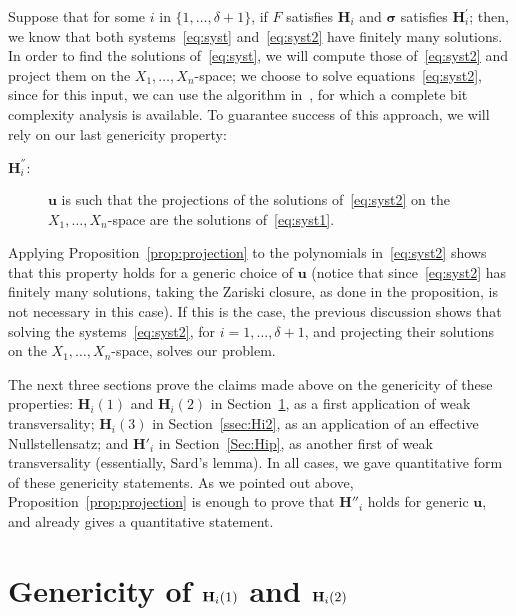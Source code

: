 \documentclass[12pt]{article}
\begin{document}
Suppose that for some $i$ in $\{1,\dots,\delta+1\}$, if $F$ satisfies
$\bm H_i$ and $\bm \sigma$ satisfies $\bm H_i^{'}$; then, we know that
both systems~\eqref{eq:syst} and~\eqref{eq:syst2} have finitely many
solutions. In order to find the solutions of~\eqref{eq:syst}, we will
compute those of~\eqref{eq:syst2} and project them on the
$X_1,\dots,X_n$-space; we choose to solve equations~\eqref{eq:syst2},
since for this input, we can use the algorithm in~\cite{SH}, for which
a complete bit complexity analysis is available. To guarantee success
of this approach, we will rely on our last genericity property:
\begin{description}
\item [$\bm H^{''}_i:$] $\bm u$ is such that the projections of the
  solutions of~\eqref{eq:syst2} on the $X_1,\dots,X_n$-space are the
  solutions of~\eqref{eq:syst1}.
\end{description}
Applying Proposition~\ref{prop:projection} to the polynomials
in~\eqref{eq:syst2} shows that this property holds for a generic
choice of $\bm u$ (notice that since~\eqref{eq:syst2} has finitely
many solutions, taking the Zariski closure, as done in the
proposition, is not necessary in this case). If this is the case, the
previous discussion shows that solving the systems~\eqref{eq:syst2},
for $i=1,\dots,\delta+1$, and projecting their solutions on the
$X_1,\dots,X_n$-space, solves our problem.

The next three sections prove the claims made above on the genericity
of these properties: $\bm H_i(1)$ and $\bm H_i(2)$ in
Section~\ref{sec:applications}, as a first application of weak
transversality; $\bm H_i(3)$ in Section~\ref{ssec:Hi2}, as an
application of an effective Nullstellensatz; and $\bm H'_i$ in
Section~\ref{Sec:Hip}, as another first of weak transversality
(essentially, Sard's lemma). In all cases, we gave quantitative form
of these genericity statements. As we pointed out above,
Proposition~\ref{prop:projection} is enough to prove that $\bm H''_i$
holds for generic $\bm u$, and already gives a quantitative statement.


\section{Genericity of ${\bf H}_i(1)$ and ${\bf H}_i(2)$}
\label{sec:applications}
\end{document}

